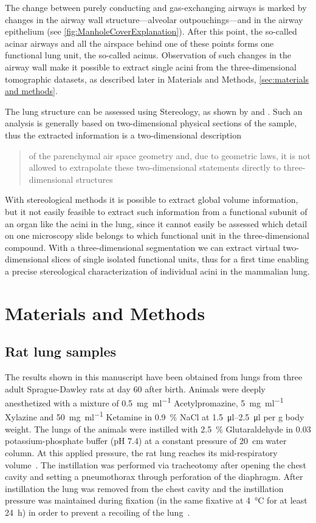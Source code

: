 \documentclass[twoside,paper=a4,abstract=true,english,DIV=calc]{scrartcl}
\begin{document}
The change between purely conducting and gas-exchanging airways is marked by changes in the airway wall structure---alveolar outpouchings---and in the airway epithelium (see \autoref{fig:ManholeCoverExplanation}). After this point, the so-called acinar airways and all the airspace behind one of these points forms one functional lung unit, the so-called acinus. Observation of such changes in the airway wall make it possible to extract single acini from the three-dimensional tomographic datasets, as described later in Materials and Methods, \autoref{sec:materials and methods}.

The lung structure can be assessed using Stereology, as shown by \citet{Hsia2010} and \citet{Tschanz2002}. Such an analysis is generally based on two-dimensional physical sections of the sample, thus the extracted information is a two-dimensional description \blockquote[\cite{Tschanz2002}]{of the parenchymal air space geometry and, due to geometric laws, it is not allowed to extrapolate these two-dimensional statements directly to three-dimensional structures}. With stereological methods it is possible to extract global volume information, but it not easily feasible to extract such information from a functional subunit of an organ like the acini in the lung, since it cannot easily be assessed which detail on one microscopy slide belongs to which functional unit in the three-dimensional compound. With a three-dimensional segmentation we can extract virtual two-dimensional slices of single isolated functional units, thus for a first time enabling a precise stereological characterization of individual acini in the mammalian lung.

\section{Materials and Methods}
\label{sec:materials and methods}
\subsection{Rat lung samples}
The results shown in this manuscript have been obtained from lungs from three adult Sprague-Dawley rats at day 60 after birth. Animals were deeply anesthetized with a mixture of %
\SI{0.5}{\milli\gram\per\milli\litre} Acetylpromazine, %
\SI{5}{\milli\gram\per\milli\litre} Xylazine and %
\SI{50}{\milli\gram\per\milli\litre} Ketamine in %
\SI{0.9}{\percent} NaCl at \SIrange{1.5}{2.5}{\micro\litre} per \si{\gram} body weight. The lungs of the animals were instilled with \SI{2.5}{\percent} Glutaraldehyde in \SI{0.03}{\Molar} potassium-phosphate buffer (pH 7.4) at a constant pressure of \SI{20}{\centi\meter} water column. At this applied pressure, the rat lung reaches its mid-respiratory volume~\cite{Schittny1998}. The instillation was performed via tracheotomy after opening the chest cavity and setting a pneumothorax through perforation of the diaphragm. After instillation the lung was removed from the chest cavity and the instillation pressure was maintained during fixation (in the same fixative at \SI{4}{\celsius} for at least \SI{24}{\hour}) in order to prevent a recoiling of the lung~\cite{Tschanz2002}.
\end{document}
